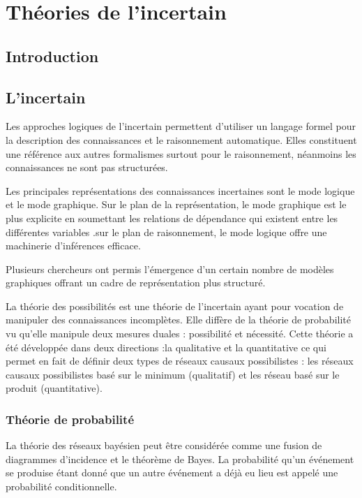 \chapter{Théories de l'incertain}

{}
\section*{Introduction}

\section{L’incertain}

Les approches logiques de l’incertain permettent d’utiliser un langage formel pour la description des connaissances et le raisonnement automatique. Elles constituent une référence aux autres formalismes surtout pour le raisonnement, néanmoins les connaissances ne  sont pas structurées.

Les principales représentations des connaissances incertaines sont le mode logique et le mode graphique.\cite{hkhallafiThesis}
Sur le plan de la représentation, le mode graphique est le plus explicite en soumettant les relations de dépendance qui existent entre les différentes variables .sur le plan de raisonnement, le mode logique offre une machinerie d’inférences efficace.

Plusieurs chercheurs ont permis l’émergence d’un certain nombre de modèles graphiques offrant un cadre de représentation plus structuré.

La théorie des possibilités est une théorie de l’incertain ayant pour vocation de manipuler des connaissances incomplètes. Elle diffère de la théorie de probabilité  vu qu'elle manipule deux mesures duales : possibilité et nécessité. Cette théorie a été développée dans deux directions :la qualitative et la quantitative ce qui permet en fait de définir deux types de réseaux causaux possibilistes : les réseaux causaux possibilistes basé sur le minimum (qualitatif) et les réseau basé sur le produit (quantitative).\cite{hkhallafiThesis}\cite{kZebouchi2Thesis}
\subsection{Théorie de probabilité}

La théorie des réseaux bayésien peut être considérée comme une fusion de diagrammes d'incidence et le théorème de Bayes. La probabilité qu'un événement se produise étant donné que un autre événement a déjà eu lieu est appelé une probabilité conditionnelle. 

